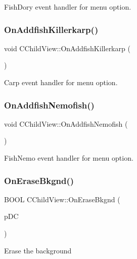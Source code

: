 Fish\+Dory event handler for menu option. \mbox{\label{class_c_child_view_a0d3175bb87c2e24572d6c0364abebd07}} 
\subsubsection{\texorpdfstring{On\+Addfish\+Killerkarp()}{OnAddfishKillerkarp()}}
{\footnotesize\ttfamily void C\+Child\+View\+::\+On\+Addfish\+Killerkarp (\begin{DoxyParamCaption}{ }\end{DoxyParamCaption})}

Carp event handler for menu option. \mbox{\label{class_c_child_view_a6fddae71d821dd64cfae1359e8a33a62}} 
\subsubsection{\texorpdfstring{On\+Addfish\+Nemofish()}{OnAddfishNemofish()}}
{\footnotesize\ttfamily void C\+Child\+View\+::\+On\+Addfish\+Nemofish (\begin{DoxyParamCaption}{ }\end{DoxyParamCaption})}

Fish\+Nemo event handler for menu option. \mbox{\label{class_c_child_view_a6060e6d09d522d345dcee5a01d41c1f0}} 
\subsubsection{\texorpdfstring{On\+Erase\+Bkgnd()}{OnEraseBkgnd()}}
{\footnotesize\ttfamily B\+O\+OL C\+Child\+View\+::\+On\+Erase\+Bkgnd (\begin{DoxyParamCaption}\item[{C\+DC $\ast$}]{p\+DC }\end{DoxyParamCaption})}

Erase the background


